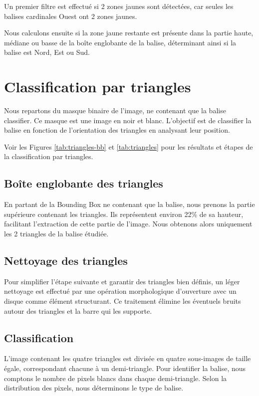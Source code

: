 \documentclass{article}
\begin{document}
Un premier filtre est effectué si 2 zones jaunes sont détectées, car seules les
balises cardinales Ouest ont 2 zones jaunes.

Nous calculons ensuite si la zone jaune restante est présente dans la partie
haute, médiane ou basse de la boîte englobante de la balise, déterminant ainsi
si la balise est Nord, Est ou Sud.

\section{Classification par triangles}

Nous repartons du masque binaire de l’image, ne contenant que la balise
classifier. Ce masque est une image en noir et blanc. L’objectif est de
classifier la balise en fonction de l’orientation des triangles en analysant
leur position.

Voir les Figures \ref{tab:triangles-bb} et \ref{tab:triangles} pour les résultats et étapes de la classification par triangles.

\subsection{Boîte englobante des triangles}

En partant de la Bounding Box ne contenant que la balise, nous prenons la
partie supérieure contenant les triangles. Ils représentent environ 22\% de sa
hauteur, facilitant l’extraction de cette partie de l’image. Nous obtenons
alors uniquement les 2 triangles de la balise étudiée.

\subsection{Nettoyage des triangles}

Pour simplifier l’étape suivante et garantir des triangles bien définis, un
léger nettoyage est effectué par une opération morphologique d’ouverture avec
un disque comme élément structurant. Ce traitement élimine les éventuels bruits
autour des triangles et la barre qui les supporte.

\subsection{Classification}

L’image contenant les quatre triangles est divisée en quatre sous-images de
taille égale, correspondant chacune à un demi-triangle. Pour identifier la
balise, nous comptons le nombre de pixels blancs dans chaque demi-triangle.
Selon la distribution des pixels, nous déterminons le type de balise.
\end{document}
